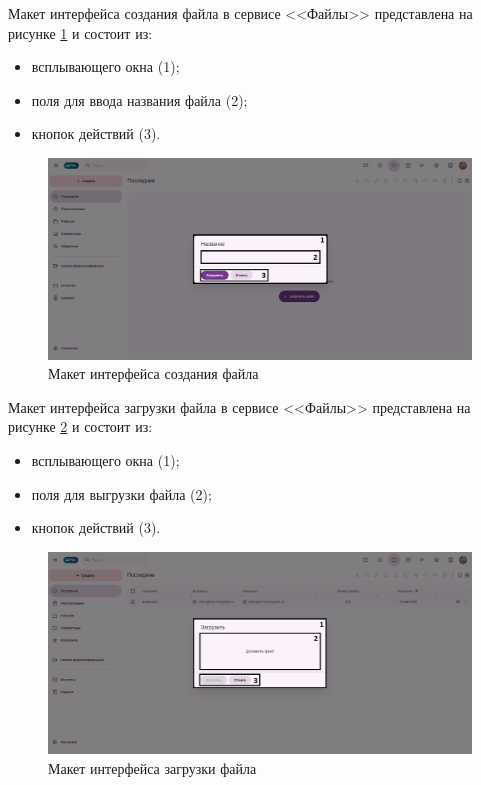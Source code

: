 Макет интерфейса создания файла в сервисе <<Файлы>> представлена на рисунке \ref{templ:image9b} и состоит из:
\begin{itemize}
  \item всплывающего окна (1);
  \item поля для ввода названия файла (2);
  \item кнопок действий (3).
\end{itemize}
\begin{figure}[H]
	\centering
	\includegraphics[width=1\linewidth]{images/файлы2}
	\caption{Макет интерфейса создания файла}
	\label{templ:image9b}
\end{figure}

Макет интерфейса загрузки файла в сервисе <<Файлы>> представлена на рисунке \ref{templ:image9c} и состоит из:
\begin{itemize}
  \item всплывающего окна (1);
  \item поля для выгрузки файла (2);
  \item кнопок действий (3).
\end{itemize}
\begin{figure}[H]
	\centering
	\includegraphics[width=1\linewidth]{images/файлы3}
	\caption{Макет интерфейса загрузки файла}
	\label{templ:image9c}
\end{figure}

